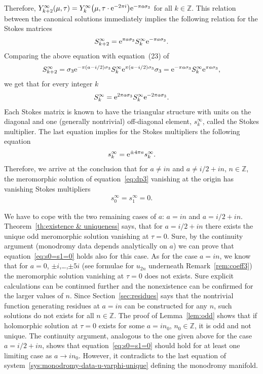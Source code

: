 \documentclass[pdftex]{sigma}
\numberwithin{equation}{section}
\begin{document}
Therefore, $Y_{k+2}^\infty(\mu,\tau)=Y_k^\infty\big(\mu,\tau\cdot {\rm e}^{-2\pi i}\big){\rm e}^{-\pi a\sigma_3}$ for all $k\in\mathbb Z$. This relation between
the canonical solutions immediately implies the following relation for the Stokes matrices
\begin{gather*}
S_{k+2}^\infty={\rm e}^{\pi a\sigma_3}S_k^\infty {\rm e}^{-\pi a\sigma_3}.
\end{gather*}
Comparing the above equation with equation~(23) of \cite{KV2004}
\begin{gather}\label{eq:23ofKV2004}
S_{k+2}^\infty=\sigma_3{\rm e}^{-\pi(a-i/2)\sigma_3}S_k^\infty {\rm e}^{\pi(a-i/2)\sigma_3}\sigma_3=
{\rm e}^{-\pi a\sigma_3}S_k^\infty {\rm e}^{\pi a\sigma_3},
\end{gather}
we get that for every integer $k$
\begin{gather*}
S_k^\infty={\rm e}^{2\pi a\sigma_3}S_k^\infty {\rm e}^{-2\pi a\sigma_3}.
\end{gather*}
Each Stokes matrix is known to have the triangular structure with units on the diagonal and one (generally
nontrivial) off-diagonal element, $s_k^\infty$, called the Stokes multiplier. The last equation implies for the
Stokes multipliers the following equation
\begin{gather*}
s_k^\infty={\rm e}^{\pm4\pi a}s_k^\infty.
\end{gather*}
Therefore, we arrive at the conclusion that for $a\neq in$ and $a\neq i/2+in$, $n\in\mathbb Z$, the
meromorphic solution of equation~\eqref{eq:dp3} vanishing at the origin has vanishing Stokes multipliers
\begin{gather}\label{eq:s0=s1=0}
s_0^\infty=s_1^\infty=0.
\end{gather}

We have to cope with the two remaining cases of $a$: $a=in$ and $a=i/2+in$. Theorem~\ref{th:existence & uniqueness}
says, that for $a=i/2+in$ there exists the unique odd meromorphic solution vanishing at $\tau=0$. Sure, by the
continuity argument (monodromy data depends analytically on $a$) we can prove that equation~\eqref{eq:s0=s1=0}
holds also for this case.
As for the case $a=in$, we know that for $a=0$, $\pm i$,\ldots,$\pm5i$ (see formulae for $u_{2n}$ underneath
Remark~\ref{rem:coeff3}) the meromorphic solution vanishing at $\tau=0$ does not exists. Sure explicit calculations
can be continued further and the nonexistence can be confirmed for the larger values of $n$.
Since Section~\ref{sec:residues} says that the nontrivial function generating residues at $a=in$ can be constructed
for any $n$, such solutions do not exists for all $n\in\mathbb Z$. The proof of Lemma~\ref{lem:odd} shows that if
holomorphic solution at $\tau=0$ exists for some $a=in_0$, $n_0\in\mathbb Z$, it is odd and not unique.
The continuity argument, analogous to the one given above for the case $a=i/2+in$, shows that
equation~\eqref{eq:s0=s1=0} should hold for at least one limiting case as $a\to in_0$. However, it contradicts
to the last equation of system~\eqref{sys:monodromy-data-u-varphi-unique} defining the monodromy manifold.
\end{document}
